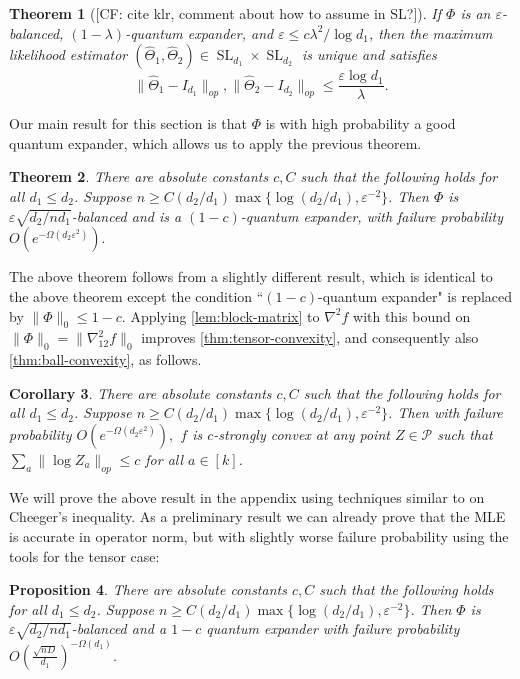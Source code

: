 \documentclass[aos]{imsart}
\newtheorem{theorem}{Theorem}
\newtheorem{corollary}[theorem]{Corollary}
\newtheorem{prop}[theorem]{Proposition}
\theoremstyle{definition}
\newcommand{\eps}{\varepsilon}
\newcommand{\SL}{\operatorname{SL}}
\newcommand{\SPD}{\mathcal{P}}
\newcommand{\CF}[1]{{\color{purple}[CF: #1]}}
\begin{document}
\begin{theorem}[\CF{cite klr, comment about how to assume in SL?}]\label{thm:klr}
If $\Phi$ is an $\eps$-balanced, $(1 - \lambda)$-quantum expander, and $\eps \leq c \lambda^2/\log d_1$, then the maximum likelihood estimator $(\widehat{\Theta}_1, \widehat{\Theta}_2) \in \SL_{d_1}\times \SL_{d_2}$ is unique and satisfies
$$\| \widehat{\Theta}_1 - I_{d_1}\|_{op}, \| \widehat{\Theta}_2 - I_{d_2}\|_{op} \leq \frac{\eps \log d_1}{\lambda}.$$
\end{theorem}
Our main result for this section is that $\Phi$ is with high probability a good quantum expander, which allows us to apply the previous theorem.

\begin{theorem}\label{thm:operator-cheeger}
There are absolute constants $c, C$ such that the following holds for all $d_1 \leq d_2$. Suppose $n \geq C (d_2/d_1) \max\{\log (d_2/d_1),  \eps^{-2}\} $. Then $\Phi$ is $\eps \sqrt{d_2/n d_1}$-balanced and is a $(1 - c)$-quantum expander, with failure probability $O(e^{ - \Omega( d_2 \eps^2)}).$
\end{theorem}
The above theorem follows from a slightly different result, which is identical to the above theorem except the condition ``$(1-c)$-quantum expander" is replaced by $\|\Phi\|_0 \leq 1 - c$. Applying \cref{lem:block-matrix} to $\nabla^2 f$ with this bound on $\|\Phi\|_0 = \|\nabla^2_{12} f\|_{0}$ improves \cref{thm:tensor-convexity}, and consequently also \cref{thm:ball-convexity}, as follows. 

\begin{corollary}\label{cor:matrix-convexity} There are absolute constants $c, C$ such that the following holds for all $d_1 \leq d_2$. Suppose $n \geq C (d_2/d_1) \max\{\log (d_2/d_1),  \eps^{-2}\} $. Then with failure probability $O(e^{ - \Omega( d_2 \eps^2)}),$ $f$ is $c$-strongly convex at any point $Z \in \SPD$ such that $\sum_a \|\log Z_a\|_{op} \leq c$ for all $a \in [k]$.
\end{corollary}


We will prove the above result in the appendix using techniques similar to \cite{FM20} on Cheeger's inequality. As a preliminary result we can already prove that the MLE is accurate in operator norm, but with slightly worse failure probability using the tools for the tensor case:

\begin{prop} \label{thm: operator-Pisier}
There are absolute constants $c, C$ such that the following holds for all $d_1 \leq d_2$. Suppose $n \geq C (d_2/d_1) \max\{\log (d_2/d_1),  \eps^{-2}\} $. Then $\Phi$ is $\eps \sqrt{d_2/n d_1}$-balanced and a $1 - c$ quantum expander with failure probability $O \left(\frac {\sqrt{nD}}{d_1}\right)^{ - \Omega(d_1)}$.
\end{prop}
\end{document}
